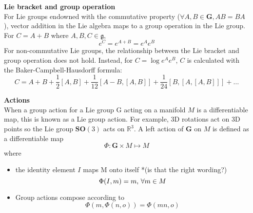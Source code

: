 		\textbf{Lie bracket and group operation}\\					
			For Lie groups endowned with the commutative property ($\forall A,B \in \mathbf{G}, AB = BA$), vector addition in the Lie algebra maps to a group operation in the Lie group. For $C = A + B$ where $A,B,C \in \mathfrak{g}$,
			\begin{equation}
				e^C = e^{A+B} = e^Ae^B
			\end{equation}
			For non-commutative Lie groups, the relationship between the Lie bracket and group operation does not hold. Instead, for $C = \log{e^Ae^B}$, $C$ is calculated with the Baker-Campbell-Hausdorff formula:
			\begin{equation}
				C = A + B + \frac{1}{2}[A,B] + \frac{1}{12}[A-B,[A,B]] + \frac{1}{24}[B,[A,[A,B]]] + \dots
			\end{equation}	
		
		\textbf{Actions}\\
			When a group action for a Lie group G acting on a manifold $M$ is a differentiable map, this is known as a Lie group action. For example, 3D rotations act on 3D points so the Lie group $\mathbf{SO}(3)$ acts on $\mathbb{R}^3$. A left action of $\mathbf{G}$ on $M$ is defined as a differentiable map
			\begin{equation}
				\Phi: \mathbf{G} \times M \mapsto M
			\end{equation}
			where
			\begin{itemize}
			\item the identity element $I$ maps M onto itself *(is that the right wording?)
				\begin{equation}
					\Phi(I,m) = m \textnormal{, } \forall m \in M
				\end{equation}
			\item Group actions compose according to
				\begin{equation}
					\Phi(m,\Phi(n,o)) = \Phi(mn,o)
				\end{equation}
			\end{itemize}
		
		\begin{comment}	
		\textbf{Adjoint map}\\		
		EXPLANATION???\\
		For $A \in \mathbf{G}$ and $B \in ?$ define a function $\Psi$, known as the adjoint map of $\mathbf{G}$:
		\begin{equation}
			\Psi_A: \mathbf{G} \rightarrow \mathbf{G} \textnormal{, }
			\Psi_A(B) \stackrel{\Delta}{=} ABA^{-1}
		\end{equation}
		Taking the derivative:
		\begin{equation}
			\frac{\partial}{\partial t} \Psi_A(B(t))|_{t=0} = AVA^{-1} \textnormal{, }
			V \stackrel{\Delta}{=} 	\frac{\partial}{\partial t}B(t)|_{t=0}
		\end{equation}
		The adjoint	representation of $\mathbf{G}$ is given by the mapping
		\begin{equation}
			\textbf{Adj}_A: \mathfrak{g} \rightarrow \mathfrak{g} \textnormal{, }
			\textbf{Adj}_A(V) \stackrel{\Delta}{=} AVA^{-1}
		\end{equation}
		\end{comment}
		
